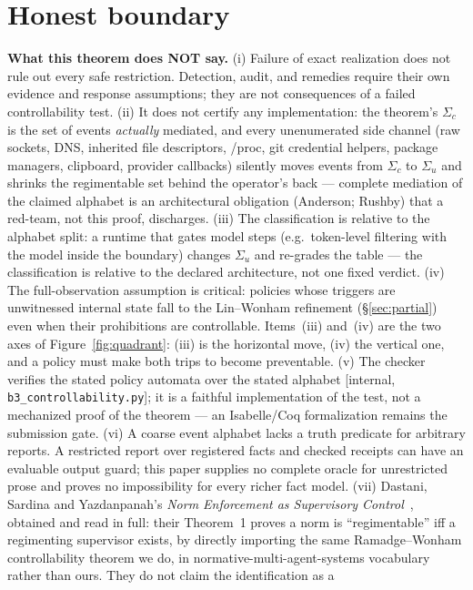 \documentclass[11pt,a4paper]{article}  \usepackage{mdframed} \usepackage{graphicx} \usepackage{tabularx}
\begin{document}
\section{Honest boundary}\label{sec:boundary} \begin{boundary} \textbf{What this theorem does NOT say.} (i) Failure of exact realization does not rule out every safe
restriction. Detection, audit, and remedies require their own evidence and
response assumptions; they are not consequences of a failed controllability
test. (ii) It does not certify any implementation: the theorem's $\Sigma_c$ is the set of events
\emph{actually} mediated, and every unenumerated side channel (raw sockets, DNS, inherited file descriptors, /proc, git
credential helpers, package managers, clipboard, provider callbacks) silently moves events from $\Sigma_c$ to $\Sigma_u$ and
shrinks the regimentable set behind the operator's back --- complete mediation of the claimed alphabet is an architectural
obligation (Anderson; Rushby) that a red-team, not this proof, discharges. (iii) The classification is relative to the
alphabet split: a runtime that gates model steps (e.g.\ token-level filtering with the model inside the boundary) changes
$\Sigma_u$ and re-grades the table --- the classification is relative to the declared architecture, not one fixed verdict. (iv)
The full-observation assumption is critical: policies whose triggers are unwitnessed internal state fall to the
Lin--Wonham refinement (\S\ref{sec:partial}) even when their prohibitions are controllable. Items~(iii) and~(iv) are the two
axes of Figure~\ref{fig:quadrant}: (iii) is the horizontal move, (iv) the vertical one, and a policy must make both trips to
become preventable. (v) The checker verifies the
stated policy automata over the stated alphabet [internal, \texttt{b3\_\allowbreak controllability.py}]; it is a faithful implementation
of the test, not a mechanized proof of the theorem --- an Isabelle/Coq formalization remains the submission gate. (vi) A coarse event alphabet lacks a truth predicate for arbitrary reports.
A restricted report over registered facts and checked receipts can have an
evaluable output guard; this paper supplies no complete oracle for unrestricted
prose and proves no impossibility for every richer fact model. (vii) Dastani, Sardina and Yazdanpanah's \emph{Norm
Enforcement as Supervisory Control}~\cite{dsy17}, obtained and read in full: their Theorem~1 proves a norm is
``regimentable'' iff a regimenting supervisor exists, by directly importing the same Ramadge--Wonham controllability
theorem we do, in normative-multi-agent-systems vocabulary rather than ours. They do not claim the identification as a

\end{boundary}
\end{document}
